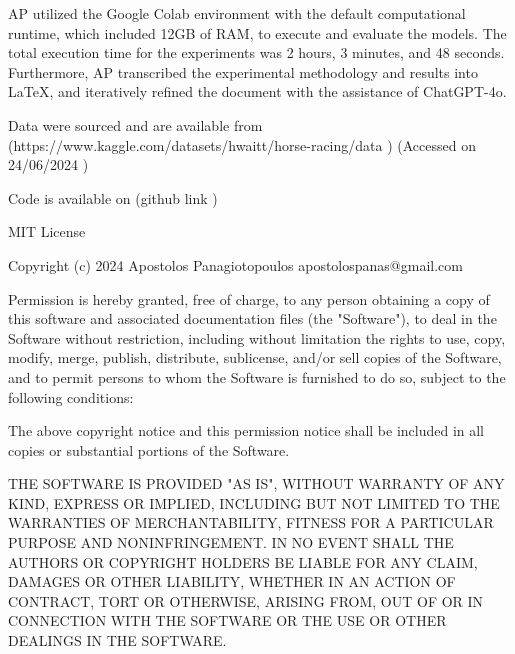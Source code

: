 \documentclass{article}
\begin{document}
AP utilized the Google Colab environment with the default computational runtime, which included 12GB of RAM, to execute and evaluate the models. The total execution time for the experiments was 2 hours, 3 minutes, and 48 seconds. Furthermore, AP transcribed the experimental methodology and results into LaTeX, and iteratively refined the document with the assistance of ChatGPT-4o. 

Data were sourced and are available from (https://www.kaggle.com/datasets/hwaitt/horse-racing/data ) (Accessed on 24/06/2024 ) 

Code is available on (github link ) 



MIT License

Copyright (c) 2024 Apostolos Panagiotopoulos
apostolospanas@gmail.com

Permission is hereby granted, free of charge, to any person obtaining a copy
of this software and associated documentation files (the "Software"), to deal
in the Software without restriction, including without limitation the rights
to use, copy, modify, merge, publish, distribute, sublicense, and/or sell
copies of the Software, and to permit persons to whom the Software is
furnished to do so, subject to the following conditions:

The above copyright notice and this permission notice shall be included in all
copies or substantial portions of the Software.

THE SOFTWARE IS PROVIDED "AS IS", WITHOUT WARRANTY OF ANY KIND, EXPRESS OR
IMPLIED, INCLUDING BUT NOT LIMITED TO THE WARRANTIES OF MERCHANTABILITY,
FITNESS FOR A PARTICULAR PURPOSE AND NONINFRINGEMENT. IN NO EVENT SHALL THE
AUTHORS OR COPYRIGHT HOLDERS BE LIABLE FOR ANY CLAIM, DAMAGES OR OTHER
LIABILITY, WHETHER IN AN ACTION OF CONTRACT, TORT OR OTHERWISE, ARISING FROM,
OUT OF OR IN CONNECTION WITH THE SOFTWARE OR THE USE OR OTHER DEALINGS IN THE
SOFTWARE.
\end{document}
